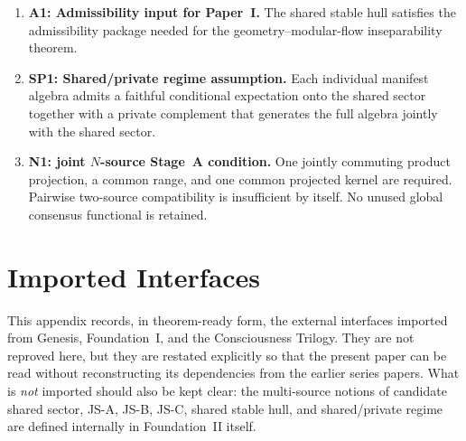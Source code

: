\documentclass[12pt]{article}
\theoremstyle{definition}
\theoremstyle{remark}
\begin{document}
\begin{enumerate}
\item \textbf{A1: Admissibility input for Paper~I.} The shared stable
  hull satisfies the admissibility package needed for the
  geometry--modular-flow inseparability theorem.

\item \textbf{SP1: Shared/private regime assumption.} Each individual
  manifest algebra admits a faithful conditional expectation onto the
  shared sector together with a private complement that generates the
  full algebra jointly with the shared sector.

\item \textbf{N1: joint \(N\)-source Stage~A condition.} One jointly
  commuting product projection, a common range, and one common projected
  kernel are required. Pairwise two-source compatibility is insufficient
  by itself. No unused global consensus functional is retained.
\end{enumerate}

\appendix

\section{Imported Interfaces}
\label{app:premises}

This appendix records, in theorem-ready form, the external interfaces
imported from Genesis, Foundation~I, and the Consciousness Trilogy. They
are not reproved here, but they are restated explicitly so that the
present paper can be read without reconstructing its dependencies from
the earlier series papers. What is \emph{not} imported should also be
kept clear: the multi-source notions of candidate shared sector, JS-A,
JS-B, JS-C, shared stable hull, and shared/private regime are defined
internally in Foundation~II itself.
\end{document}
